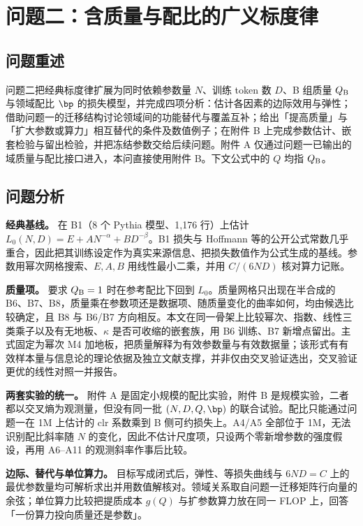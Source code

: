 \section{问题二：含质量与配比的广义标度律}
\label{sec:5.3}

\subsection{问题重述}
\label{sec:5.3.1}

问题二把经典标度律扩展为同时依赖参数量 $N$、训练 token 数 $D$、B 组质量 $Q_{\rm B}$ 与领域配比 $\bp$ 的损失模型，并完成四项分析：估计各因素的边际效用与弹性；借助问题一的迁移结构讨论领域间的功能替代与覆盖互补；给出「提高质量」与「扩大参数或算力」相互替代的条件及数值例子；在附件 B 上完成参数估计、嵌套检验与留出检验，并把冻结参数交给后续问题。附件 A 仅通过问题一已输出的域质量与配比接口进入，本问直接使用附件 B。下文公式中的 $Q$ 均指 $Q_{\rm B}$。

\subsection{问题分析}
\label{sec:5.3.2}

\textbf{经典基线。} 在 B1（8 个 Pythia 模型、1,176 行）上估计 $L_0(N,D)=E+AN^{-\alpha}+BD^{-\beta}$\cite{pythia}。B1 损失与 Hoffmann 等\cite{hoffmann}的公开公式常数几乎重合，因此把其训练设定作为真实来源信息、把损失数值作为公式生成的基线。参数用幂次网格搜索、$E,A,B$ 用线性最小二乘，并用 $C/(6ND)$ 核对算力记账。

\textbf{质量项。} 要求 $Q_{\rm B}=1$ 时在参考配比下回到 $L_0$。质量网格只出现在半合成的 B6、B7、B8，质量乘在参数项还是数据项、随质量变化的曲率如何，均由候选比较确定，且 B8 与 B6/B7 方向相反。本文在同一骨架上比较幂次、指数、线性三类乘子以及有无地板、$\kappa$ 是否可收缩的嵌套族，用 B6 训练、B7 新增点留出。主式固定为幂次 M4 加地板，把质量解释为有效参数量与有效数据量；该形式有有效样本量与信息论的理论依据及独立文献支撑\cite{subramanyam}，并非仅由交叉验证选出，交叉验证更优的线性对照一并报告。

\textbf{两套实验的统一。} 附件 A 是固定小规模的配比实验，附件 B 是规模实验，二者都以交叉熵为观测量，但没有同一批 $(N,D,Q,\bp)$ 的联合试验。配比只能通过问题一在 1M 上估计的 clr 系数乘到 B 侧可约损失上。A4/A5 全部位于 1M，无法识别配比斜率随 $N$ 的变化，因此不估计尺度项，只设两个零新增参数的强度假设，再用 A6–A11 的观测斜率作事后比较。

\textbf{边际、替代与单位算力。} 目标写成闭式后，弹性、等损失曲线与 $6ND=C$ 上的最优参数量均可解析求出并用数值解核对。领域关系取自问题一迁移矩阵行向量的余弦；单位算力比较把提质成本 $g(Q)$ 与扩参数算力放在同一 FLOP 上，回答「一份算力投向质量还是参数」。


